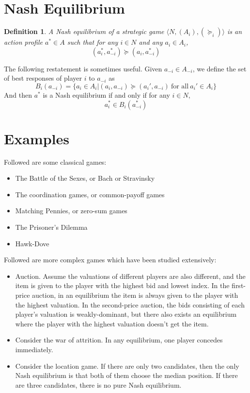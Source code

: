 \documentclass[openany]{book}
\newtheorem{definition}{Definition}[chapter]
\begin{document}
\section{Nash Equilibrium}
\begin{definition}
A Nash equilibrium of a strategic game $\langle N,(A_i),(\succeq_i)\rangle$ is an action profile $a^*\in A$ such that for any $i\in N$ and any $a_i\in A_i$,
$$(a_i^*,a_{-i}^*)\succeq(a_i,a_{-i}^*)$$
\end{definition}
The following restatement is sometimes useful. Given $a_{-i}\in A_{-i}$, we define the set of best responses of player $i$ to $a_{-i}$ as
$$B_i(a_{-i})=\{a_i\in A_i|(a_i,a_{-i})\succeq(a_i',a_{-i})\ \textrm{for all}\ a_i'\in A_i\}$$
And then $a^*$ is a Nash equilibrium if and only if for any $i\in N$,
$$a_i^*\in B_i(a_{-i}^*)$$

\section{Examples}
Followed are some classical games:
\begin{itemize}
\item The Battle of the Sexes, or Bach or Stravinsky
\item The coordination games, or common-payoff games
\item Matching Pennies, or zero-sum games
\item The Prisoner's Dilemma
\item Hawk-Dove
\end{itemize}

Followed are more complex games which have been studied extensively:
\begin{itemize}
\item Auction. Assume the valuations of different players are also different, and the item is given to the player with the highest bid and lowest index. In the first-price auction, in an equilibrium the item is always given to the player with the highest valuation. In the second-price auction, the bids consisting of each player's valuation is weakly-dominant, but there also exists an equilibrium where the player with the highest valuation doesn't get the item.
\item Consider the war of attrition. In any equilibrium, one player concedes immediately.
\item Consider the location game. If there are only two candidates, then the only Nash equilibrium is that both of them choose the median position. If there are three candidates, there is no pure Nash equilibrium.
\end{itemize}
\end{document}
